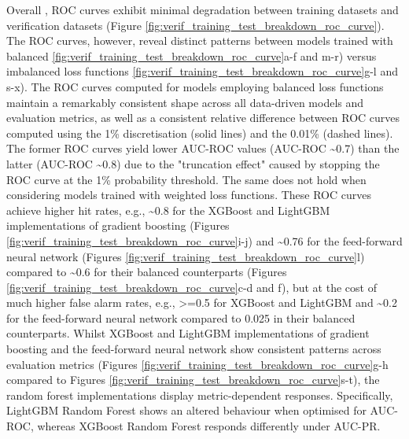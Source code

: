 Overall , ROC curves exhibit minimal degradation between \textcolor{colourTraining}{training datasets} and \textcolor{colourTest}{verification datasets} (Figure \ref{fig:verif_training_test_breakdown_roc_curve}). The ROC curves, however, reveal distinct patterns between models trained with balanced \ref{fig:verif_training_test_breakdown_roc_curve}a-f and m-r) versus imbalanced loss functions \ref{fig:verif_training_test_breakdown_roc_curve}g-l and s-x). The ROC curves computed for models employing balanced loss functions maintain a remarkably consistent shape across all data-driven models and evaluation metrics, as well as a consistent relative difference between ROC curves computed using the 1\% discretisation (solid lines) and the 0.01\% (dashed lines). The former ROC curves yield lower AUC-ROC values (AUC-ROC \sim0.7) than the latter (AUC-ROC \sim0.8) due to the "truncation effect" caused by stopping the ROC curve at the 1\% probability threshold. The same does not hold when considering models trained with weighted loss functions. These ROC curves achieve higher hit rates, e.g., \sim0.8 for the XGBoost and LightGBM implementations of gradient boosting (Figures \ref{fig:verif_training_test_breakdown_roc_curve}i-j) and \sim0.76 for the feed-forward neural network (Figures \ref{fig:verif_training_test_breakdown_roc_curve}l) compared to \sim0.6 for their balanced counterparts (Figures \ref{fig:verif_training_test_breakdown_roc_curve}c-d and f), but at the cost of much higher false alarm rates, e.g., >=0.5 for XGBoost and LightGBM and \sim0.2 for the feed-forward neural network compared to 0.025 in their balanced counterparts. Whilst XGBoost and LightGBM implementations of gradient boosting and the feed-forward neural network show consistent patterns across evaluation metrics (Figures \ref{fig:verif_training_test_breakdown_roc_curve}g-h compared to Figures \ref{fig:verif_training_test_breakdown_roc_curve}s-t), the random forest implementations display metric-dependent responses. Specifically, LightGBM Random Forest shows an altered behaviour when optimised for AUC-ROC, whereas XGBoost Random Forest responds differently under AUC-PR.

